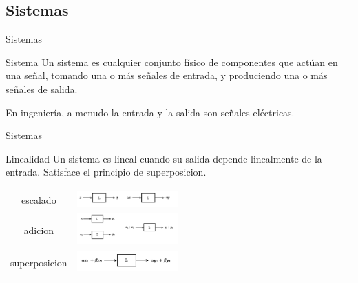  \subsection{Sistemas}
 \begin{frame}{Sistemas}
    \begin{block}{Sistema}
       Un sistema es cualquier conjunto físico de componentes que actúan en una señal, tomando una o más señales de entrada, y produciendo una o más señales de salida.
    \end{block}
    En ingeniería, a menudo la entrada y la salida son señales eléctricas.\\
    \vfill
 \end{frame}
 \begin{frame}{Sistemas}
    \begin{block}{Linealidad}
       Un sistema es lineal cuando su salida depende linealmente de la entrada.
       Satisface el principio de superposicion.
    \end{block}
    \begin{centering}
       \begin{table}[h]
          \begin{tabular}{cm{6cm}cm{6cm}}
             escalado      & \includegraphics[width=0.4\textwidth]{1_clase/superposicion1}\\
             adicion       & \includegraphics[width=0.4\textwidth]{1_clase/superposicion2}\\
             superposicion & \includegraphics[width=0.4\textwidth]{1_clase/superposicion3}\\
          \end{tabular}
       \end{table}
    \end{centering}
    \vfill
 \end{frame}
